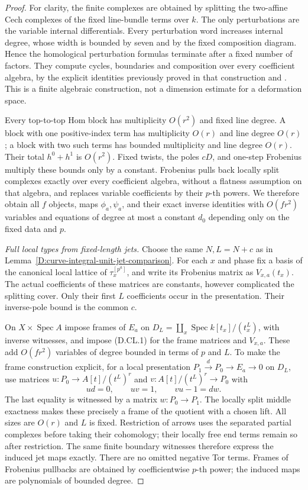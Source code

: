 \begin{proof}
For clarity, the finite complexes are obtained by splitting the
two-affine Cech complexes of the fixed line-bundle terms over $k$.
The only perturbations are the variable internal differentials.
Every perturbation word increases internal degree, whose width is
bounded by seven and by the fixed composition diagram. Hence the
homological perturbation formulas terminate after a fixed number
of factors. They compute cycles, boundaries and composition over
every coefficient algebra, by the explicit identities previously
proved in that construction and
\citep[Sections~2.1--2.4 and~3.2]{C_Crainic2004Perturbation}.
This is a finite algebraic construction, not a dimension estimate
for a deformation space.

Every top-to-top Hom block has multiplicity $O(r^2)$ and fixed line
degree. A block with one positive-index term has multiplicity
$O(r)$ and line degree $O(r)$; a block with two such terms has
bounded multiplicity and line degree $O(r)$. Their total $h^0+h^1$
is $O(r^2)$. Fixed twists, the poles $cD$, and one-step Frobenius
multiply these bounds only by a constant. Frobenius pulls back
locally split complexes exactly over every coefficient algebra,
without a flatness assumption on that algebra, and replaces
variable coefficients by their $p$-th powers. We therefore obtain
all $f$ objects, maps $\phi_a,\psi_a$, and their exact inverse
identities with $O(fr^2)$ variables and equations of degree at
most a constant $d_0$ depending only on the fixed data and $p$.

\emph{Full local types from fixed-length jets.}
Choose the same $N,L=N+c$ as in
Lemma~\ref{D:curve-integral-unit-jet-comparison}. For each $x$ and
phase fix a basis of the canonical local lattice of $\tau_x^{[p^a]}$,
and write its Frobenius matrix as $V_{x,a}(t_x)$. The actual
coefficients of these matrices are constants, however complicated
the splitting cover. Only their first $L$ coefficients occur in
the presentation. Their inverse-pole bound is the common $c$.

On $X\times\operatorname{Spec}A$ impose frames of $E_a$ on
$D_L=\coprod_x\operatorname{Spec}k[t_x]/(t_x^L)$, with inverse
witnesses, and impose (D.CL.1) for the frame matrices and
$V_{x,a}$. These add $O(fr^2)$ variables of degree bounded in
terms of $p$ and $L$. To make the frame construction explicit,
for a local presentation $P_1\xrightarrow d P_0\to E_a\to0$
on $D_L$, use matrices $u:P_0\to A[t]/(t^L)^r$ and
$v:A[t]/(t^L)^r\to P_0$ with
\[
 u d=0,\qquad uv=1,\qquad vu-1=d w.
 \tag{D.CL.9}
\]
The last equality is witnessed by a matrix $w:P_0\to P_1$.
The locally split middle exactness makes these precisely a frame
of the quotient with a chosen lift. All sizes are $O(r)$ and $L$
is fixed. Restriction of arrows uses the separated partial
complexes before taking their cohomology; their locally free end
terms remain so after restriction. The same finite boundary
witnesses therefore express the induced jet maps exactly. There
are no omitted negative Tor terms. Frames of Frobenius pullbacks
are obtained by coefficientwise $p$-th power; the induced maps
are polynomials of bounded degree.


\end{proof}

